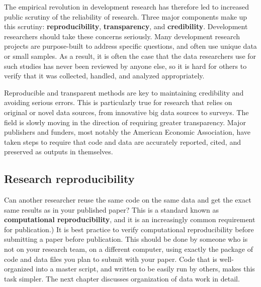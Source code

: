 The empirical revolution in development research\cite{angrist2017economic}
has therefore led to increased public scrutiny of the reliability of research.\cite{rogers_2017}
Three major components make up this scrutiny: \textbf{reproducibility}\cite{duvendack2017meant}, \textbf{transparency},\cite{christensen2018transparency} and \textbf{credibility}.\cite{ioannidis2017power}
Development researchers should take these concerns seriously.
Many development research projects are purpose-built to address specific questions,
and often use unique data or small samples.
As a result, it is often the case that the data 
researchers use for such studies has never been reviewed by anyone else,
so it is hard for others to verify that it was 
collected, handled, and analyzed appropriately.

Reproducible and transparent methods are key to maintaining credibility 
and avoiding serious errors. 
This is particularly true for research that relies on original or novel data sources, 
from innovative big data sources to surveys. 
The field is slowly moving in the direction of requiring greater transparency. 
Major publishers and funders, most notably the American Economic Association,
have taken steps to require that code and data
are accurately reported, cited, and preserved as outputs in themselves.


\subsection{Research reproducibility}

Can another researcher reuse the same code on the same data 
and get the exact same results as in your published paper?
This is a standard known as \textbf{computational reproducibility}, 
and it is an increasingly common requirement for publication.)
It is best practice to verify computational reproducibility before submitting a paper before publication. 
This should be done by someone who is not on your research team, on a different computer, 
using exactly the package of code and data files you plan to submit with your paper. 
Code that is well-organized into a master script, and written to be easily run by others, 
makes this task simpler. 
The next chapter discusses organization of data work in detail. 

